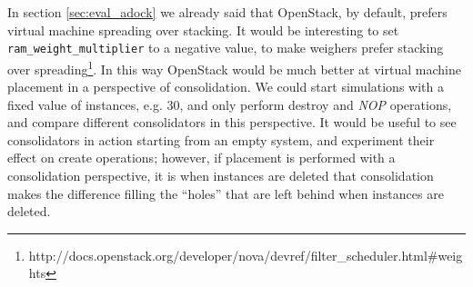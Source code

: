 In section \ref{sec:eval_adock} we already said that OpenStack, by default, prefers virtual machine spreading over stacking. It would be interesting to set \texttt{ram\_weight\_multiplier} to a negative value, to make weighers prefer stacking over spreading\footnote{http://docs.openstack.org/developer/nova/devref/filter\_scheduler.html\#weights}. In this way OpenStack would be much better at virtual machine placement in a perspective of consolidation. We could start simulations with a fixed value of instances, e.g. $30$, and only perform destroy and \textit{NOP} operations, and compare different consolidators in this perspective. It would be useful to see consolidators in action starting from an empty system, and experiment their effect on create operations; however, if placement is performed with a consolidation perspective, it is when instances are deleted that consolidation makes the difference filling the ``holes'' that are left behind when instances are deleted.